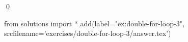 
    \begin{ex}
  \label{ex:double-for-loop-3}
  
  \qed
\end{ex}
\begin{python0}
from solutions import *
add(label="ex:double-for-loop-3",
    srcfilename='exercises/double-for-loop-3/answer.tex') 
\end{python0}                              
